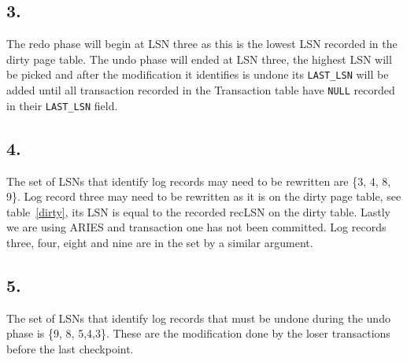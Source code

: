 \documentclass[12pt]{article}
\begin{document}
\subsection*{3.}
The redo phase will begin at LSN three as this is the lowest LSN recorded in the dirty page table. The undo phase will ended at LSN three, the highest LSN will be picked and after the modification it identifies is undone its \texttt{LAST\_LSN} will be added until all transaction recorded in the Transaction table have \texttt{NULL} recorded in their \texttt{LAST\_LSN} field.
\subsection*{4.}
The set of LSNs that identify log records may need to be rewritten are \{3, 4, 8, 9\}. Log record three may need to be rewritten as it is on the dirty page table, see table~\ref{dirty}, its LSN is equal to the recorded recLSN on the dirty table. Lastly we are using ARIES and transaction one has not been committed. Log records three, four, eight and nine are in the set by a similar argument.
\subsection*{5.}
The set of LSNs that identify log records that must be undone during the undo phase is \{9, 8, 5,4,3\}. These are the modification done by the loser transactions before the last checkpoint.
\end{document}
